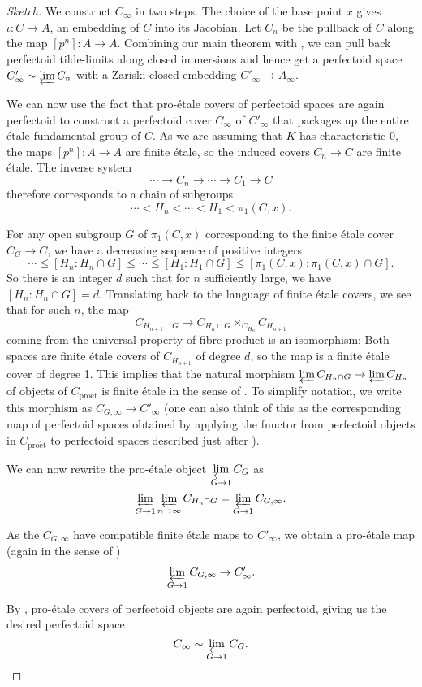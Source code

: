 \documentclass[10pt,oneside]{amsart}
\theoremstyle{definition}
\newcommand{\proet}{\operatorname{pro\acute{e}t}}
\begin{document}
\begin{proof}[Sketch]
We construct $C_\infty$ in two steps. 
The choice of the base point $x$ gives $\iota\colon C\rightarrow A$, an embedding of $C$ into its Jacobian. Let $C_n$ be the pullback of $C$ along the map $[p^n]\colon A\rightarrow A$. Combining our main theorem with \cite[Lemma II.2.2]{torsion}, we can pull back perfectoid tilde-limits along closed immersions and hence get a perfectoid space $C'_\infty\sim \varprojlim C_n$ with a Zariski closed embedding $C'_\infty\rightarrow A_\infty$.

We can now use the fact that pro-\'etale covers of perfectoid spaces are again perfectoid to construct a perfectoid cover $C_\infty$ of $C'_\infty$ that packages up the entire \'etale fundamental group of $C$. As we are assuming that $K$ has characteristic 0, the maps $[p^n]\colon A\rightarrow A$ are finite \'etale, so the induced covers $C_n\rightarrow C$ are finite \'etale. The inverse system 
\[\cdots \rightarrow C_n \rightarrow \cdots \rightarrow C_1\rightarrow C\] 
therefore corresponds to a chain of subgroups
\[\cdots < H_n <\cdots < H_1 < \pi_1(C,x).\]

For any open subgroup $G$ of $\pi_1(C,x)$ corresponding to the finite \'etale cover $C_G\rightarrow C$, we have a decreasing sequence of positive integers 
\[\cdots \leq [H_n:H_n\cap G] \leq \cdots \leq [H_1:H_1\cap G]\leq [\pi_1(C,x):\pi_1(C,x)\cap G].\]
So there is an integer $d$ such that for $n$ sufficiently large, we have $[H_n:H_n\cap G]=d$. Translating back to the language of finite \'etale covers, we see that for such $n$, the map
\[C_{H_{n+1}\cap G}\rightarrow C_{H_n\cap G}\times_{C_{H_n}} C_{H_{n+1}}\]
coming from the universal property of fibre product is an isomorphism: Both spaces are finite \'etale covers of $C_{H_{n+1}}$ of degree $d$, so the map is a finite \'etale cover of degree 1. This implies that the natural morphism $\varprojlim C_{H_n \cap G}\rightarrow \varprojlim C_{H_n}$ of objects of $C_{\text{pro\'et}}$ is finite \'etale in the sense of \cite[Definition 3.9]{p-adic_Hodge}. To simplify notation, we write this morphism as $C_{G,\infty}\rightarrow C'_\infty$ (one can also think of this as the corresponding map of perfectoid spaces obtained by applying the functor from perfectoid objects in $C_{\proet}$ to perfectoid spaces described just after \cite[Lemma 4.5]{p-adic_Hodge}).

We can now rewrite the pro-\'etale object $\displaystyle\varprojlim_{G\rightarrow 1} C_G$ as \[\varprojlim_{G\rightarrow 1}\displaystyle\varprojlim_{n\rightarrow \infty} C_{H_n\cap G}=\varprojlim_{G\rightarrow 1}C_{G,\infty}.\]

As the $C_{G,\infty}$ have compatible finite \'etale maps to $C'_\infty$, we obtain a pro-\'etale map (again in the sense of \cite[Definition 3.9]{p-adic_Hodge}) 
\[\varprojlim_{G\rightarrow 1}C_{G,\infty}\rightarrow C'_\infty.\]

By \cite[Lemma 4.6]{p-adic_Hodge}, pro-\'etale covers of perfectoid objects are again perfectoid, giving us the desired perfectoid space 
\[ C_\infty\sim\varprojlim_{G\rightarrow 1} C_G.\qedhere\]

\end{proof}
\end{document}
